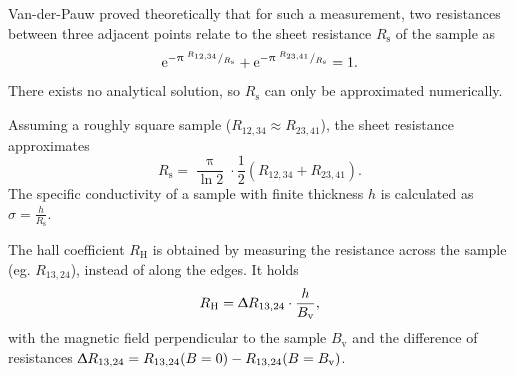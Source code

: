 Van-der-Pauw proved theoretically that for such a measurement, two resistances between three adjacent points relate to the sheet resistance $R_\text{s}$ of the sample as
\begin{equation}
	\mathrm{e}^{- \uppi \; ^{R_{12,34}}/_{R_\text{s}}} + \mathrm{e}^{- \uppi \; ^{R_{23,41}}/_{R_\text{s}}} = 1.
\end{equation}
There exists no analytical solution, so $R_\text{s}$ can only be approximated numerically.

Assuming a roughly square sample ($R_{12,34} \approx R_{23,41}$), the sheet resistance approximates
\begin{equation*}
	R_\text{s} = \frac{\uppi}{\ln 2} \cdot \frac{1}{2} \left( R_{12,34} + R_{23,41} \right).
\end{equation*}
The specific conductivity of a sample with finite thickness $h$ is calculated as $\sigma = \frac{h}{R_\text{s}}$.

The hall coefficient $R_\text{H}$ is obtained by measuring the resistance across the sample (eg. $R_{13,24}$), instead of along the edges.
It holds
\begin{equation*}
	R_\text{H} = \Updelta R_{13,24} \cdot \frac{h}{B_\text{v}},
\end{equation*}
with the magnetic field perpendicular to the sample $B_\text{v}$ and the difference of resistances $\Updelta R_{13,24} = R_{13,24}(B = 0) - R_{13,24}(B = B_\text{v})$.
